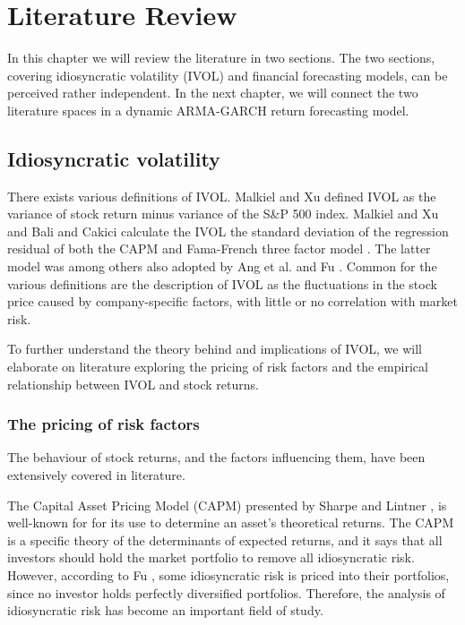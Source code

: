 \chapter{Literature Review}
\label{LR}
In this chapter we will review the literature in two sections. The two sections, covering idiosyncratic volatility (IVOL) and financial forecasting models, can be perceived rather independent. In the next chapter, we will connect the two literature spaces in a dynamic ARMA-GARCH return forecasting model. 

\section{Idiosyncratic volatility}  
There exists various definitions of IVOL. Malkiel and Xu \cite{malkielxu97} defined IVOL as the variance of stock return minus variance of the S\&P 500 index. Malkiel and Xu \cite{malkielxu04} and Bali and Cakici \cite{balicakici08} calculate the IVOL the standard deviation of the regression residual of both the CAPM and Fama-French three factor model \cite{famafrench}. The latter model was among others also adopted by Ang et al. \cite{angetal06} \cite{angetal09}  and Fu \cite{Fu}. Common for the various definitions are the description of IVOL as the fluctuations in the stock price caused by company-specific factors, with little or no correlation with market risk.

To further understand the theory behind and implications of IVOL, we will elaborate on literature exploring the pricing of risk factors and the empirical relationship between IVOL and stock returns.

\subsection{The pricing of risk factors}
The behaviour of stock returns, and the factors influencing them, have been extensively covered in literature. 

The Capital Asset Pricing Model (CAPM) presented by Sharpe \cite{sharpe} and Lintner \cite{litner}, is well-known for for its use to determine an asset's theoretical returns. The CAPM is a specific theory of the determinants of expected returns, and it says that all investors should hold the market portfolio to remove all idiosyncratic risk. However, according to Fu \cite{Fu}, some idiosyncratic risk is priced into their portfolios, since no investor holds perfectly diversified portfolios. Therefore, the analysis of idiosyncratic risk has become an important field of study.

